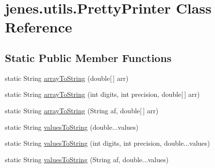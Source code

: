 \hypertarget{classjenes_1_1utils_1_1_pretty_printer}{\section{jenes.\-utils.\-Pretty\-Printer Class Reference}
\label{classjenes_1_1utils_1_1_pretty_printer}
}
\subsection*{Static Public Member Functions}
\begin{DoxyCompactItemize}
\item 
static String \hyperlink{classjenes_1_1utils_1_1_pretty_printer_af1b7970ec18b6a847d1857cd9c804ff3}{array\-To\-String} (double\mbox{[}$\,$\mbox{]} arr)
\item 
static String \hyperlink{classjenes_1_1utils_1_1_pretty_printer_a4aea4a04a4f1c86a0b69c66b6831705d}{array\-To\-String} (int digits, int precision, double\mbox{[}$\,$\mbox{]} arr)
\item 
static String \hyperlink{classjenes_1_1utils_1_1_pretty_printer_a2bf0b08b7aeaa282a3169be54103e0a0}{array\-To\-String} (String af, double\mbox{[}$\,$\mbox{]} arr)
\item 
static String \hyperlink{classjenes_1_1utils_1_1_pretty_printer_a15b2c468ec5e89b449a51a532d3b2601}{values\-To\-String} (double...\-values)
\item 
static String \hyperlink{classjenes_1_1utils_1_1_pretty_printer_af380a69bc4dac9e7dee1a178f26b4b12}{values\-To\-String} (int digits, int precision, double...\-values)
\item 
static String \hyperlink{classjenes_1_1utils_1_1_pretty_printer_a89c8fe653fb9bd04437bc2dcde97718e}{values\-To\-String} (String af, double...\-values)
\end{DoxyCompactItemize}



